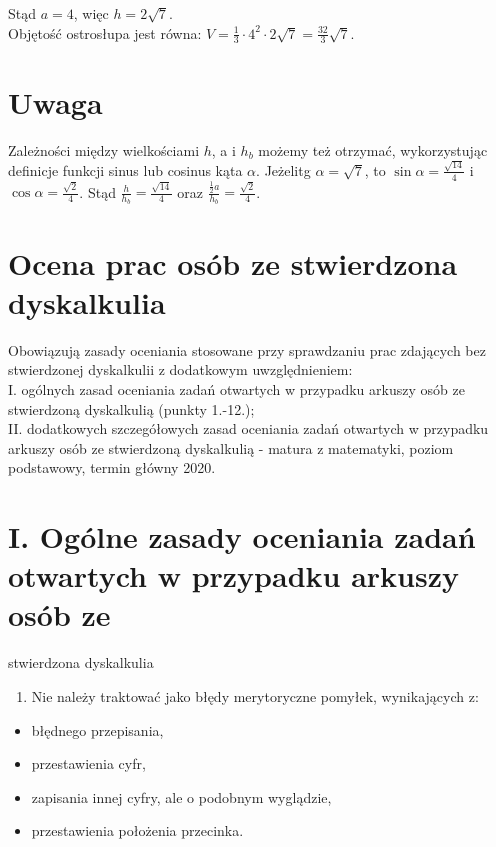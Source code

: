 \documentclass[10pt]{article}
\begin{document}
Stąd $a=4$, więc $h=2 \sqrt{7}$.\\
Objętość ostrosłupa jest równa: $V=\frac{1}{3} \cdot 4^{2} \cdot 2 \sqrt{7}=\frac{32}{3} \sqrt{7}$.

\section*{Uwaga}
Zależności między wielkościami $h$, a i $h_{b}$ możemy też otrzymać, wykorzystując definicje funkcji sinus lub cosinus kąta $\alpha$. Jeżelitg $\alpha=\sqrt{7}$, to $\sin \alpha=\frac{\sqrt{14}}{4}$ i $\cos \alpha=\frac{\sqrt{2}}{4}$. Stąd $\frac{h}{h_{b}}=\frac{\sqrt{14}}{4}$ oraz $\frac{\frac{1}{2} a}{h_{b}}=\frac{\sqrt{2}}{4}$.

\section*{Ocena prac osób ze stwierdzona dyskalkulia}
Obowiązują zasady oceniania stosowane przy sprawdzaniu prac zdających bez stwierdzonej dyskalkulii z dodatkowym uwzględnieniem:\\
I. ogólnych zasad oceniania zadań otwartych w przypadku arkuszy osób ze stwierdzoną dyskalkulią (punkty 1.-12.);\\
II. dodatkowych szczegółowych zasad oceniania zadań otwartych w przypadku arkuszy osób ze stwierdzoną dyskalkulią - matura z matematyki, poziom podstawowy, termin główny 2020.

\section*{I. Ogólne zasady oceniania zadań otwartych w przypadku arkuszy osób ze}
 stwierdzona dyskalkulia\begin{enumerate}
  \item Nie należy traktować jako błędy merytoryczne pomyłek, wynikających z:
\end{enumerate}

\begin{itemize}
  \item błędnego przepisania,
  \item przestawienia cyfr,
  \item zapisania innej cyfry, ale o podobnym wyglądzie,
  \item przestawienia położenia przecinka.
\end{itemize}
\end{document}
